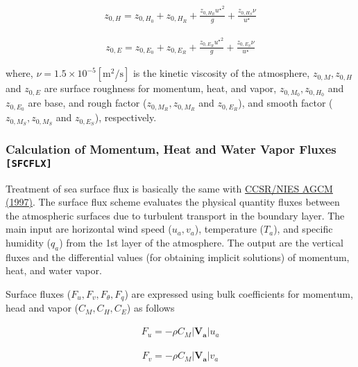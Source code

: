 \begin{eqnarray}
    z_{0,H} = z_{0,H_0} + z_{0,H_R} + \frac{z_{0,H_R} {u^\star }^2 }{g} + \frac{z_{0,H_S}\nu }{u^\star}
\end{eqnarray}

\begin{eqnarray}
    z_{0,E} = z_{0,E_0} + z_{0,E_R} + \frac{z_{0,E_R} {u^\star }^2 }{g} + \frac{z_{0,E_S}\nu }{u^\star}
\end{eqnarray}

where, \(\nu = 1.5 \times 10^{-5} \mathrm{[m^2/s]}\) is the kinetic
viscosity of the atmosphere, \(z_{0,M},z_{0,H}\) and \(z_{0,E}\) are
surface roughness for momentum, heat, and vapor, \(z_{0,M_0},z_{0,H_0}\)
and \(z_{0,E_0}\) are base, and rough factor (\(z_{0,M_R},z_{0,M_R}\)
and \(z_{0,E_R}\)), and smooth factor (\(z_{0,M_S},z_{0,M_S}\) and
\(z_{0,E_S}\)), respectively.

\hypertarget{calculation-of-momentum-heat-and-water-vapor-fluxes-sfcflx}{%
\subsubsection{\texorpdfstring{Calculation of Momentum, Heat and Water
Vapor Fluxes
\texttt{{[}SFCFLX{]}}}{Calculation of Momentum, Heat and Water Vapor Fluxes {[}SFCFLX{]}}}\label{calculation-of-momentum-heat-and-water-vapor-fluxes-sfcflx}}

Treatment of sea surface flux is basically the same with
\href{https://github.com/MIROC-DOC/model_description/blob/master/org/AGCM5.6-Tech.pdf}{CCSR/NIES
AGCM (1997)}. The surface flux scheme evaluates the physical quantity
fluxes between the atmospheric surfaces due to turbulent transport in
the boundary layer. The main input are horizontal wind speed
(\(u_a, v_a\)), temperature (\(T_a\)), and specific humidity (\(q_a\))
from the 1st layer of the atmosphere. The output are the vertical fluxes
and the differential values (for obtaining implicit solutions) of
momentum, heat, and water vapor.

Surface fluxes (\(F_u, F_v, F_\theta, F_q\)) are expressed using bulk
coefficients for momentum, head and vapor (\(C_M, C_H, C_E\)) as follows

\begin{eqnarray}
    F_u  =  - \rho C_M |\mathbf{V_a}| u_a
\end{eqnarray}

\begin{eqnarray}
    F_v  =  - \rho C_M |\mathbf{V_a}| v_a
\end{eqnarray}

